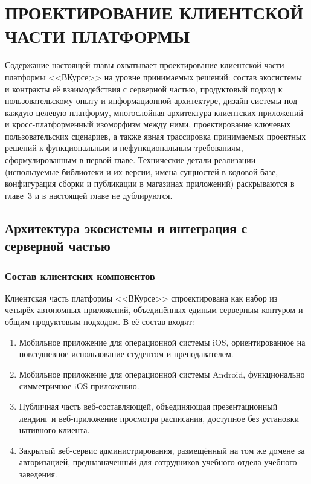 
\clearpage
\section{ПРОЕКТИРОВАНИЕ КЛИЕНТСКОЙ ЧАСТИ ПЛАТФОРМЫ}

Содержание настоящей главы охватывает проектирование клиентской части платформы <<ВКурсе>> на уровне принимаемых решений: состав экосистемы и контракты её взаимодействия с серверной частью, продуктовый подход к пользовательскому опыту и информационной архитектуре, дизайн-системы под каждую целевую платформу, многослойная архитектура клиентских приложений и кросс-платформенный изоморфизм между ними, проектирование ключевых пользовательских сценариев, а также явная трассировка принимаемых проектных решений к функциональным и нефункциональным требованиям, сформулированным в первой главе. Технические детали реализации (используемые библиотеки и их версии, имена сущностей в кодовой базе, конфигурация сборки и публикации в магазинах приложений) раскрываются в главе~3 и в настоящей главе не дублируются.

\subsection{Архитектура экосистемы и интеграция с серверной частью}
\label{subsec:ecosystem-architecture}

\subsubsection{Состав клиентских компонентов}
\label{subsubsec:client-components}

Клиентская часть платформы <<ВКурсе>> спроектирована как набор из четырёх автономных приложений, объединённых единым серверным контуром и общим продуктовым подходом. В её состав входят:

\begin{enumerate}
  \item Мобильное приложение для операционной системы iOS, ориентированное на повседневное использование студентом и преподавателем.
  \item Мобильное приложение для операционной системы Android, функционально симметричное iOS-приложению.
  \item Публичная часть веб-составляющей, объединяющая презентационный лендинг и веб-приложение просмотра расписания, доступное без установки нативного клиента.
  \item Закрытый веб-сервис администрирования, размещённый на том же домене за авторизацией, предназначенный для сотрудников учебного отдела учебного заведения.
\end{enumerate}

